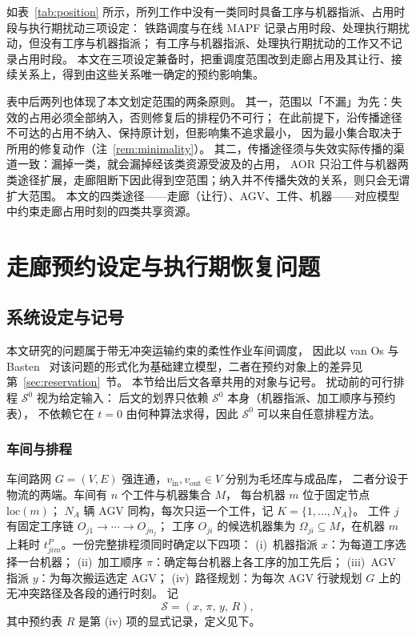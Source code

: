 \documentclass[manuscript,screen,review]{acmart}
\begin{document}
如表~\ref{tab:position} 所示，所列工作中没有一类同时具备工序与机器指派、占用时段与执行期扰动三项设定：
铁路调度与在线 MAPF 记录占用时段、处理执行期扰动，但没有工序与机器指派；
有工序与机器指派、处理执行期扰动的工作又不记录占用时段。
本文在三项设定兼备时，把重调度范围改到走廊占用及其让行、接续关系上，得到由这些关系唯一确定的预约影响集。

表中后两列也体现了本文划定范围的两条原则。
其一，范围以「不漏」为先：失效的占用必须全部纳入，否则修复后的排程仍不可行；
在此前提下，沿传播途径不可达的占用不纳入、保持原计划，但影响集不追求最小，
因为最小集合取决于所用的修复动作（注~\ref{rem:minimality}）。
其二，传播途径须与失效实际传播的渠道一致：漏掉一类，就会漏掉经该类资源受波及的占用，
AOR 只沿工件与机器两类途径扩展，走廊阻断下因此得到空范围；纳入并不传播失效的关系，则只会无谓扩大范围。
本文的四类途径——走廊（让行）、AGV、工件、机器——对应模型中约束走廊占用时刻的四类共享资源。

\section{走廊预约设定与执行期恢复问题}
\label{sec:problem}

\subsection{系统设定与记号}
\label{sec:system_brief}

本文研究的问题属于带无冲突运输约束的柔性作业车间调度，
因此以 van Os 与 Basten~\cite{vanos2026exact} 对该问题的形式化为基础建立模型，二者在预约对象上的差异见第~\ref{sec:reservation}~节。
本节给出后文各章共用的对象与记号。
扰动前的可行排程 \(\mathcal{S}^0\) 视为给定输入：
后文的划界只依赖 \(\mathcal{S}^0\) 本身（机器指派、加工顺序与预约表），
不依赖它在 \(t=0\) 由何种算法求得，因此 \(\mathcal{S}^0\) 可以来自任意排程方法。

\subsubsection{车间与排程}
\label{sec:shop}

车间路网 \(G=(V,E)\) 强连通，\(v_{\mathrm{in}},v_{\mathrm{out}}\in V\) 分别为毛坯库与成品库，
二者分设于物流的两端。车间有 \(n\) 个工件与机器集合 \(M\)，
每台机器 \(m\) 位于固定节点 \(\mathrm{loc}(m)\)；
\(N_A\) 辆 AGV 同构，每次只运一个工件，记 \(K=\{1,\ldots,N_A\}\)。
工件 \(j\) 有固定工序链 \(O_{j1}\to\cdots\to O_{jn_j}\)；
工序 \(O_{ji}\) 的候选机器集为 \(\Omega_{ji}\subseteq M\)，在机器 \(m\) 上耗时
\(t^P_{jim}\)。一份完整排程须同时确定以下四项：
(i)~机器指派 \(x\)：为每道工序选择一台机器；
(ii)~加工顺序 \(\pi\)：确定每台机器上各工序的加工先后；
(iii)~AGV 指派 \(y\)：为每次搬运选定 AGV；
(iv)~路径规划：为每次 AGV 行驶规划 \(G\) 上的无冲突路径及各段的通行时刻。
记
\[
\mathcal{S}=(x,\,\pi,\,y,\,R),
\]
其中预约表 \(R\) 是第 (iv) 项的显式记录，定义见下。
\end{document}
